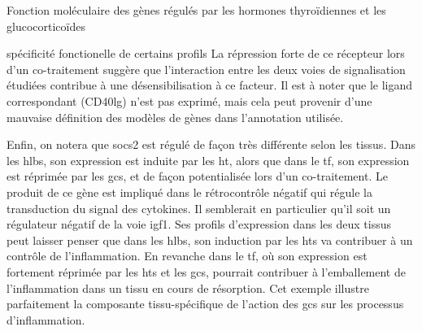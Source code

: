 \documentclass[../main.tex]{subfiles}
\begin{document}
\begin{chapter}{Fonction moléculaire des gènes régulés par les hormones thyroïdiennes et les glucocorticoïdes}
\begin{section}{spécificité fonctionelle de certains profils}
La répression forte de ce récepteur lors d'un co-traitement suggère que l'interaction entre les deux voies de signalisation étudiées contribue à une désensibilisation à ce facteur.
Il est à noter que le ligand correspondant (CD40lg) n'est pas exprimé, mais cela peut provenir d'une mauvaise définition des modèles de gènes dans l'annotation utilisée.
\par
Enfin, on notera que \gls{socs2} est régulé de façon très différente selon les tissus.
Dans les \glspl{hlb}, son expression est induite par les \gls{ht}, alors que dans le \gls{tf}, son expression est réprimée par les \glspl{gc}, et de façon potentialisée lors d'un co-traitement.
Le produit de ce gène est impliqué dans le rétrocontrôle négatif qui régule la transduction du signal des cytokines.
Il semblerait en particulier qu'il soit un régulateur négatif de la voie \gls{igf}1.
Ses profils d'expression dans les deux tissus peut laisser penser que dans les \glspl{hlb}, son induction par les \glspl{ht} va contribuer à un contrôle de l'inflammation.
En revanche dans le \gls{tf}, où son expression est fortement réprimée par les \glspl{ht} et les \glspl{gc}, pourrait contribuer à l'emballement de l'inflammation dans un tissu en cours de résorption.
Cet exemple illustre parfaitement la composante tissu-spécifique de l'action des \glspl{gc} sur les processus d'inflammation.



\end{section}
\end{chapter}
\end{document}
